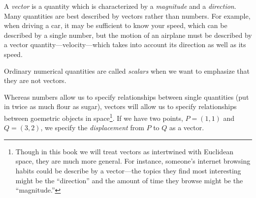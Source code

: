 A \emph{vector} is a quantity which is characterized by
a \emph{magnitude} and a \emph{direction}.   Many quantities are best
described by vectors rather than
numbers.  For example, when driving a car,
 it may be sufficient to
know your speed, which can be described by a single number,
 but the motion of an airplane must be described
by a vector quantity---velocity---which takes into account its
direction as well as its speed.

Ordinary numerical quantities are called \emph{scalars}
when we want to emphasize that they are not vectors.

Whereas numbers allow us to specify relationships between single quantities
(put in twice as much flour as sugar), vectors will allow us to specify
relationships between goemetric objects in space\footnote{
	Though in this book we will treat vectors as intertwined with Euclidean
	space, they are much more general.  For instance, someone's internet
	browsing habits could be describe by a vector---the topics they
	find most interesting might be the ``direction'' and the amount
	of time they browse might be the ``magnitude.''
}.  If we have two points, $P=(1,1)$ and $Q=(3,2)$, we specify the
\emph{displacement} from $P$ to $Q$ as a vector.

\begin{center}
	\usetikzlibrary{patterns,decorations.pathreplacing}
\end{center}

